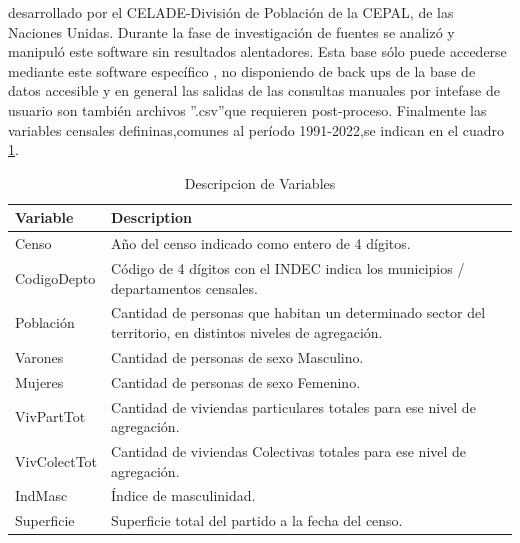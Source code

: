 \documentclass{article}
\theoremstyle{mytheoremstyle}
\theoremstyle{mytheoremstyle}
\theoremstyle{myproblemstyle}
\begin{document}
  desarrollado por el CELADE-División de Población de la CEPAL, de las Naciones Unidas.\newline
Durante la fase de investigación de fuentes se analizó y manipuló este software sin resultados alentadores.
 Esta base sólo puede accederse mediante este software específico
, no disponiendo de back ups de la base de datos accesible y en general las salidas de las consultas manuales por intefase de usuario 
son también archivos ''.csv''que requieren post-proceso.\newline
 Finalmente las variables censales defininas,comunes al período 1991-2022,se indican en el cuadro \ref{variables}.
 \begin{table}[htbp]
     \centering
     \caption{Descripcion de Variables}
     \begin{tabular}{|l|p{8cm}|}
         \hline
         \textbf{Variable} & \textbf{Description} \\
         \hline
         Censo & Año del censo indicado como entero de 4 dígitos. \\
         CodigoDepto & Código de 4 dígitos con el INDEC indica los municipios / departamentos censales. \\
         Población & Cantidad de personas que habitan un determinado sector del territorio, en distintos niveles de agregación. \\
         Varones & Cantidad de personas de sexo Masculino. \\
         Mujeres & Cantidad de personas de sexo Femenino. \\
         VivPartTot & Cantidad de viviendas particulares totales para ese nivel de agregación. \\
         VivColectTot & Cantidad de viviendas Colectivas totales para ese nivel de agregación. \\
         IndMasc & Índice de masculinidad. \\
         Superficie & Superficie total del partido a la fecha del censo. \\
         \hline
     \end{tabular}
     \label{variables}
 \end{table}
\end{document}

